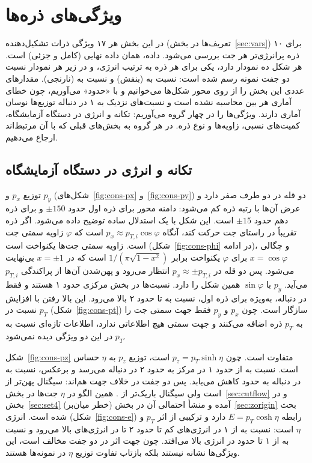 \section{ویژگی‌های ذره‌ها}
\label{sec:particles}
در این بخش هر ۱۷ ویژگی ذرات تشکیل‌دهنده (تعریف‌ها در بخش~\ref{sec:vars}) برای ۱۰ ذره پرانرژی‌تر هر جت بررسی می‌شود. داده، همان داده نهایی (کامل و جزئی) است. هر شکل ده نمودار دارد، یکی برای هر ذره به ترتیب انرژی، و در زیر هر نمودار نسبت دو جفت نمونه رسم شده است: نسبت \Zjet به \bbbb (بنفش) و نسبت \ttZ به \ttbb (نارنجی). مقدارهای عددی این بخش را از روی محور شکل‌ها می‌خوانیم و با «حدود» می‌آوریم، چون خطای آماری هر بین محاسبه نشده است و نسبت‌های نزدیک به ۱ در دنباله توزیع‌ها نوسان آماری دارند. ویژگی‌ها را در چهار گروه می‌آوریم: تکانه و انرژی در دستگاه آزمایشگاه، کمیت‌های نسبی، زاویه‌ها و نوع ذره. در هر گروه به بخش‌های قبلی که با آن مرتبط‌اند ارجاع می‌دهیم.

\subsection{تکانه و انرژی در دستگاه آزمایشگاه}
توزیع $p_x$ و $p_y$ (شکل‌های~\ref{fig:cons-px} و~\ref{fig:cons-py}) دو قله در دو طرف صفر دارد و عرض آن‌ها با رتبه ذره کم می‌شود: دامنه محور برای ذره اول حدود $\pm150$ و برای ذره دهم حدود $\pm15$ است. این شکل با یک استدلال ساده توضیح داده می‌شود. اگر ذره تقریباً در راستای جت حرکت کند، آنگاه $p_x\approx p_{T,i}\cos\varphi$ است که $\varphi$ زاویه سمتی جت است. زاویه سمتی جت‌ها یکنواخت است (شکل~\ref{fig:cons-phi} در ادامه)، و چگالی $x=\cos\varphi$ برای $\varphi$ یکنواخت برابر $1/(\pi\sqrt{1-x^2})$ است که در $x=\pm1$ بی‌نهایت می‌شود. پس دو قله در $p_x\approx\pm p_{T,i}$ انتظار می‌رود و پهن‌شدن آن‌ها از پراکندگی $p_{T,i}$ می‌آید. $p_y$ با $\sin\varphi$ همین شکل را دارد. نسبت‌ها در بخش مرکزی حدود ۱ هستند و فقط در دنباله، به‌ویژه برای ذره اول، نسبت \Zjet به \bbbb تا حدود ۲ بالا می‌رود. این بالا رفتن با افزایش نسبت در $p_T$ (شکل~\ref{fig:cons-pt}) سازگار است. چون $p_x$ و $p_y$ فقط جهت سمتی جت را به $p_T$ ذره اضافه می‌کنند و جهت سمتی هیچ اطلاعاتی ندارد، اطلاعات تازه‌ای نسبت به $p_T$ در این دو ویژگی دیده نمی‌شود.

شکل~\ref{fig:cons-pz} متفاوت است. چون $p_z=p_T\sinh\eta$ است، توزیع $p_z$ به $\eta$ حساس است. نسبت \Zjet به \bbbb از حدود ۱ در مرکز به حدود ۲ در دنباله می‌رسد و برعکس، نسبت \ttZ به \ttbb در دنباله به حدود  کاهش می‌یابد. پس دو جفت در خلاف جهت هم‌اند: سیگنال \Zjet پهن‌تر از \bbbb است ولی سیگنال \ttZ باریک‌تر از \ttbb. همین الگو در $\eta$ جت‌ها در بخش~\ref{sec:cutflow} و در بخش~\ref{sec:set4} (خطر میان‌بر) آمده و منشأ احتمالی آن در بخش~\ref{sec:zorigin} بحث شده است. انرژی (شکل~\ref{fig:cons-e}) رابطه $E=p_T\cosh\eta$ دارد و ترکیبی از اثر $p_T$ و $\eta$ است: نسبت \Zjet به \bbbb از ۱ در انرژی‌های کم تا حدود ۲ تا  در انرژی‌های بالا می‌رود و نسبت \ttZ به \ttbb از ۱ تا حدود  در انرژی بالا می‌افتد. چون جهت اثر در دو جفت مخالف است، این ویژگی‌ها نشانه \Zbos نیستند بلکه بازتاب تفاوت توزیع $\eta$ در نمونه‌ها هستند.

